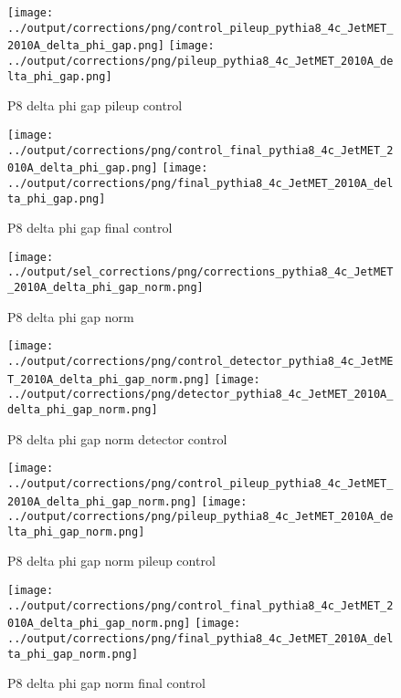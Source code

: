 \documentclass[11pt]{book}
\begin{document}
\begin{figure}[ht]
\centering
\texttt{[image: ../output/corrections/png/control\_pileup\_pythia8\_4c\_JetMET\_2010A\_delta\_phi\_gap.png]}
\texttt{[image: ../output/corrections/png/pileup\_pythia8\_4c\_JetMET\_2010A\_delta\_phi\_gap.png]}
\caption{P8 delta phi gap pileup control}
\label{fig:p8_JetMET_2010A_delta_phi_gap_pileup_control}
\end{figure}


\begin{figure}[ht]
\centering
\texttt{[image: ../output/corrections/png/control\_final\_pythia8\_4c\_JetMET\_2010A\_delta\_phi\_gap.png]}
\texttt{[image: ../output/corrections/png/final\_pythia8\_4c\_JetMET\_2010A\_delta\_phi\_gap.png]}
\caption{P8 delta phi gap final control}
\label{fig:p8_JetMET_2010A_delta_phi_gap_final_control}
\end{figure}


\begin{figure}[ht]
\centering
\texttt{[image: ../output/sel\_corrections/png/corrections\_pythia8\_4c\_JetMET\_2010A\_delta\_phi\_gap\_norm.png]}
\caption{P8 delta phi gap norm}
\label{fig:p8_JetMET_2010A_delta_phi_gap_norm}
\end{figure}

\begin{figure}[ht]
\centering
\texttt{[image: ../output/corrections/png/control\_detector\_pythia8\_4c\_JetMET\_2010A\_delta\_phi\_gap\_norm.png]}
\texttt{[image: ../output/corrections/png/detector\_pythia8\_4c\_JetMET\_2010A\_delta\_phi\_gap\_norm.png]}
\caption{P8 delta phi gap norm detector control}
\label{fig:p8_JetMET_2010A_delta_phi_gap_norm_detector_control}
\end{figure}

\begin{figure}[ht]
\centering
\texttt{[image: ../output/corrections/png/control\_pileup\_pythia8\_4c\_JetMET\_2010A\_delta\_phi\_gap\_norm.png]}
\texttt{[image: ../output/corrections/png/pileup\_pythia8\_4c\_JetMET\_2010A\_delta\_phi\_gap\_norm.png]}
\caption{P8 delta phi gap norm pileup control}
\label{fig:p8_JetMET_2010A_delta_phi_gap_norm_pileup_control}
\end{figure}


\begin{figure}[ht]
\centering
\texttt{[image: ../output/corrections/png/control\_final\_pythia8\_4c\_JetMET\_2010A\_delta\_phi\_gap\_norm.png]}
\texttt{[image: ../output/corrections/png/final\_pythia8\_4c\_JetMET\_2010A\_delta\_phi\_gap\_norm.png]}
\caption{P8 delta phi gap norm final control}
\label{fig:p8_JetMET_2010A_delta_phi_gap_norm_final_control}
\end{figure}
\end{document}
